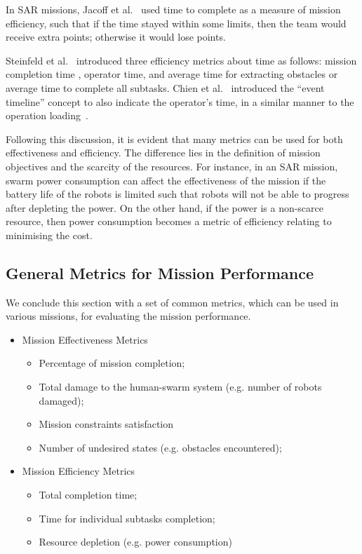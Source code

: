 \documentclass[journal]{IEEEtran}
\begin{document}
In SAR missions, Jacoff et al.~\cite{jacoff2001reference,jacoff2001standard} used time to complete as a measure of mission efficiency, such that if the time stayed within some limits, then the team would receive extra points; otherwise it would lose points.

Steinfeld et al.~\cite{steinfeld2006common} introduced three efficiency metrics about time as follows: mission completion time , operator time, and average time for extracting obstacles or average time to complete all subtasks. Chien et al.~\cite{chien2012scheduling} introduced the \enquote{event timeline} concept to also indicate the operator\textquoteright s time, in a similar manner to the operation loading~\cite{jacoff2001reference}.


Following this discussion, it is evident that many metrics can be used for both effectiveness and efficiency. The difference lies in the definition of mission objectives and the scarcity of the resources. For instance, in an SAR mission, swarm power consumption can affect the effectiveness of the mission if the battery life of the robots is limited such that robots will not  be able to progress after depleting the power. On the other hand, if the power is a non-scarce resource, then power consumption becomes a metric of efficiency relating to minimising the cost. 

\subsection{General Metrics for Mission Performance}
We conclude this section with a set of common metrics, which can be used in various missions, for evaluating the mission performance.
\begin{itemize}
\item Mission Effectiveness Metrics  
\begin{itemize}
\item Percentage of mission completion;
\item Total damage to the human-swarm system (e.g. number of robots damaged);
\item Mission constraints satisfaction
\item Number of undesired states (e.g. obstacles encountered);
\end{itemize}

\item Mission Efficiency Metrics
\begin{itemize}
\item Total completion time;
\item Time for individual subtasks completion;
\item Resource depletion (e.g. power consumption)
\end{itemize}

\end{itemize}
\end{document}
